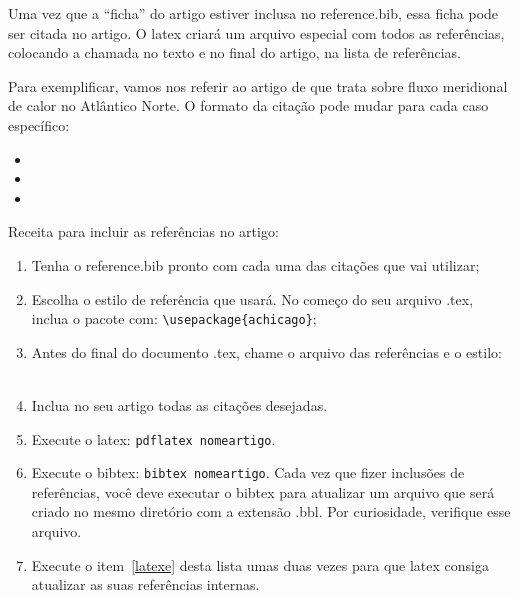 \documentclass[pdftex,12pt,a4paper]{article} %
\begin{document}
Uma vez que a ``ficha'' do artigo estiver inclusa no reference.bib,
essa ficha pode ser citada no artigo. O latex criará um arquivo
especial com todos as referências, colocando a chamada no texto e no
final do artigo, na lista de referências.

Para exemplificar, vamos nos referir ao artigo de 
que trata sobre fluxo meridional de calor no Atlântico Norte. O
formato da citação pode mudar para cada caso específico:
\begin{itemize}
  \item {}
  \item {}
  \item {}
\end{itemize}

\begin{framed}
Receita para incluir as referências no artigo:
\begin{enumerate}
\item Tenha o reference.bib pronto com cada uma das citações que vai utilizar;
  \item Escolha o estilo de referência que usará. No começo do seu
    arquivo .tex, inclua o pacote com: \verb#\usepackage{achicago}#;
  \item Antes do final do documento .tex, chame o arquivo das
    referências e o estilo:\\
    \verb##\\
    \verb##
\item Inclua no seu artigo todas as citações desejadas. 
\item Execute o latex: \verb#pdflatex nomeartigo#.\label{latexe}
  \item Execute o bibtex: \verb#bibtex nomeartigo#. Cada vez que
    fizer inclusões de referências, você deve executar o bibtex para
    atualizar um arquivo que será criado no mesmo diretório com a
    extensão .bbl. Por curiosidade, verifique esse arquivo.
\item Execute o item~\ref{latexe} desta lista umas duas vezes para que
  latex consiga atualizar as suas referências internas.
\end{enumerate}
\end{framed}




\end{document}
